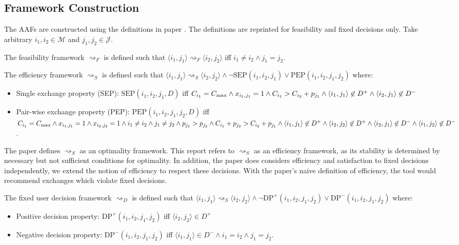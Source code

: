 \subsection{Framework Construction}

The AAFs are constructed using the definitions in paper \cite{aes}. The definitions are reprinted for feasibility and fixed decisions only. Take arbitrary $i_1,i_2\in\mathcal{M}$ and $j_1,j_2\in\mathcal{J}$.

\begin{definition}
	The feasibility framework $\rightsquigarrow_F$ is defined such that $\langle i_1,j_1\rangle\rightsquigarrow_F\langle i_2,j_2\rangle$ iff $i_1\neq i_2\land j_1=j_2$.
\end{definition}

\begin{definition}
	The efficiency framework $\rightsquigarrow_S$ is defined such that $\langle i_1,j_1\rangle\rightsquigarrow_S\langle i_2,j_2\rangle\land\neg\text{SEP}(i_1,i_2,j_1)\lor\text{PEP}(i_1,i_2,j_1,j_2)$ where:
	\begin{itemize}
		\item Single exchange property (SEP): $\text{SEP}(i_1,i_2,j_1, D)$ iff $C_{i_1}=C_{\max}\land x_{i_1,j_1}=1\land C_{i_1}>C_{i_2}+p_{j_1}\land\langle{i_1},{j_1}\rangle\not\in D^+\land\langle{i_2},{j_1}\rangle\not\in D^-$
		\item Pair-wise exchange property (PEP): $\text{PEP}(i_1,i_2,j_1,j_2, D)$ iff $C_{i_1}=C_{\max}\land x_{i_1,j_1}=1\land x_{i_2,j_2}=1\land i_1\neq i_2\land j_1\neq j_2\land p_{j_1}>p_{j_2}\land C_{i_1}+p_{j_2}>C_{i_2}+p_{j_1}\land\langle{i_1},{j_1}\rangle\not\in D^+\land\langle{i_2},{j_2}\rangle\not\in D^+\land\langle{i_2},{j_1}\rangle\not\in D^-\land\langle{i_1},{j_2}\rangle\not\in D^-$.
	\end{itemize}

The paper \cite{aes} defines $\rightsquigarrow_S$ as an optimality framework. This report refers to $\rightsquigarrow_S$ as an efficiency framework, as its stability is determined by necessary but not sufficient conditions for optimality. In addition, the paper does considers efficiency and satisfaction to fixed decisions independently, we extend the notion of efficiency to respect these decisions. With the paper's naive definition of efficiency, the tool would recommend exchanges which violate fixed decisions.

\end{definition}

\begin{definition}
	The fixed user decision framework $\rightsquigarrow_D$ is defined such that $\langle i_1,j_1\rangle\rightsquigarrow_S\langle i_2,j_2\rangle\land\neg\text{DP}^+(i_1,i_2,j_1,j_2)\lor\text{DP}^-(i_1,i_2,j_1,j_2)$ where:
	\begin{itemize}
		\item Positive decision property: $\text{DP}^+(i_1,i_2,j_1,j_2)$ iff $\langle i_2, j_2\rangle\in D^+$
		\item Negative decision property: $\text{DP}^-(i_1,i_2,j_1,j_2)$ iff $\langle i_1, j_1\rangle\in D^-\land i_1=i_2\land j_1=j_2$.
	\end{itemize}
\end{definition}

